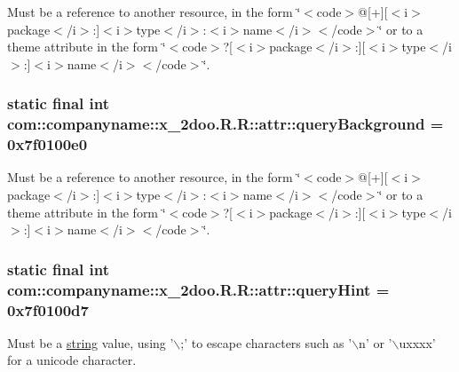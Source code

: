 Must be a reference to another resource, in the form \char`\"{}$<$code$>$@\mbox{[}+\mbox{]}\mbox{[}$<$i$>$package$<$/i$>$:\mbox{]}$<$i$>$type$<$/i$>$:$<$i$>$name$<$/i$>$$<$/code$>$\char`\"{} or to a theme attribute in the form \char`\"{}$<$code$>$?\mbox{[}$<$i$>$package$<$/i$>$:\mbox{]}\mbox{[}$<$i$>$type$<$/i$>$:\mbox{]}$<$i$>$name$<$/i$>$$<$/code$>$\char`\"{}. \hypertarget{classcom_1_1companyname_1_1x__2doo_1_1_r_1_1attr_57becf88ba0b65e664b12d8dfb286647}{
\subsubsection[{queryBackground}]{\setlength{\rightskip}{0pt plus 5cm}static final int com::companyname::x\_\-2doo.R.R::attr::queryBackground = 0x7f0100e0}}
\label{classcom_1_1companyname_1_1x__2doo_1_1_r_1_1attr_57becf88ba0b65e664b12d8dfb286647}


Must be a reference to another resource, in the form \char`\"{}$<$code$>$@\mbox{[}+\mbox{]}\mbox{[}$<$i$>$package$<$/i$>$:\mbox{]}$<$i$>$type$<$/i$>$:$<$i$>$name$<$/i$>$$<$/code$>$\char`\"{} or to a theme attribute in the form \char`\"{}$<$code$>$?\mbox{[}$<$i$>$package$<$/i$>$:\mbox{]}\mbox{[}$<$i$>$type$<$/i$>$:\mbox{]}$<$i$>$name$<$/i$>$$<$/code$>$\char`\"{}. \hypertarget{classcom_1_1companyname_1_1x__2doo_1_1_r_1_1attr_2e0b0bcb94039ce843ad3c674a157a40}{
\subsubsection[{queryHint}]{\setlength{\rightskip}{0pt plus 5cm}static final int com::companyname::x\_\-2doo.R.R::attr::queryHint = 0x7f0100d7}}
\label{classcom_1_1companyname_1_1x__2doo_1_1_r_1_1attr_2e0b0bcb94039ce843ad3c674a157a40}


Must be a \hyperlink{classcom_1_1companyname_1_1x__2doo_1_1_r_1_1string}{string} value, using '$\backslash$;' to escape characters such as '$\backslash$n' or '$\backslash$uxxxx' for a unicode character. 

